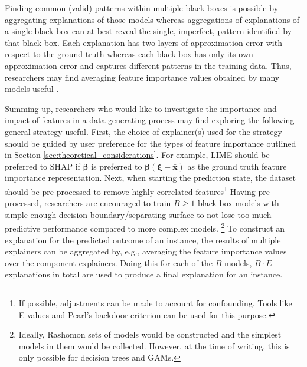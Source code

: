 \documentclass[mnsc,blindrev]{informs3}
\begin{document}
            Finding common (valid) patterns within multiple black boxes is possible by aggregating explanations of those models whereas aggregations of explanations of a single black box can at best reveal the single, imperfect, pattern identified by that black box. Each explanation has two layers of approximation error with respect to the ground truth whereas each black box has only its own approximation error and captures different patterns in the training data. Thus, researchers may find averaging feature importance values obtained by many models useful \citep{dong2020variable,donnelly2023rashomon}.  %
            
            Summing up, researchers who would like to investigate the importance and impact of features in a data generating process may find exploring the following general strategy useful. First, the choice of explainer(s) used for the strategy should be guided by user preference for the types of feature importance outlined in Section \ref{sec:theoretical_considerations}. For example, LIME should be preferred to SHAP if $\boldsymbol{\beta}$ is preferred to $\boldsymbol{\beta}(\boldsymbol{\xi}-\bar{\mathbf{x}})$ as the ground truth feature importance representation.  %
            Next, when starting the prediction state, the dataset should be pre-processed to remove highly correlated features\footnote{If possible, adjustments can be made to account for confounding. Tools like E-values\citep{gaster2023quantifying} and Pearl's backdoor criterion can be used for this purpose.}%
            Having pre-processed, researchers are encouraged to train $B\geq 1$ black box models with simple enough decision boundary/separating surface to not lose too much predictive performance compared to more complex models. \footnote{Ideally, Rashomon sets of models would be constructed and the simplest models in them would be collected. However, at the time of writing, this is only possible for decision trees and GAMs.} To construct an explanation for the predicted outcome of an instance, the results of multiple explainers can be aggregated by, e.g., averaging the feature importance values over the component explainers. Doing this for each of the $B$ models, $B\cdot E$ explanations in total are used to produce a final explanation for an instance.
            
\end{document}
